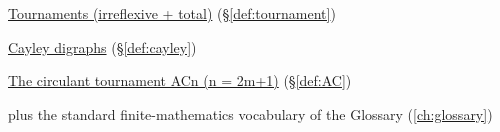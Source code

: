 \begin{closurepanel}
\item \hyperref[def:tournament]{Tournaments (irreflexive + total)} (\S\ref*{def:tournament})
\item \hyperref[def:cayley]{Cayley digraphs} (\S\ref*{def:cayley})
\item \hyperref[def:AC]{The circulant tournament ACn (n = 2m+1)} (\S\ref*{def:AC})
\item plus the standard finite-mathematics vocabulary of the Glossary (\cref{ch:glossary})
\end{closurepanel}
